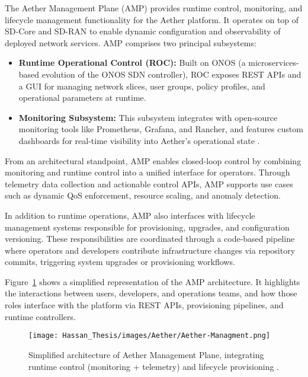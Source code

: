 The Aether Management Plane (AMP) provides runtime control, monitoring, and lifecycle management functionality for the Aether platform. It operates on top of SD-Core and SD-RAN to enable dynamic configuration and observability of deployed network services. AMP comprises two principal subsystems:

\begin{itemize}
    \item \textbf{Runtime Operational Control (ROC):} Built on \textmu ONOS (a microservices-based evolution of the ONOS SDN controller), ROC exposes REST APIs and a GUI for managing network slices, user groups, policy profiles, and operational parameters at runtime.
    
    \item \textbf{Monitoring Subsystem:} This subsystem integrates with open-source monitoring tools like Prometheus, Grafana, and Rancher, and features custom dashboards for real-time visibility into Aether's operational state \cite{roc_monitoring}.
\end{itemize}

From an architectural standpoint, AMP enables closed-loop control by combining monitoring and runtime control into a unified interface for operators. Through telemetry data collection and actionable control APIs, AMP supports use cases such as dynamic QoS enforcement, resource scaling, and anomaly detection.

In addition to runtime operations, AMP also interfaces with lifecycle management systems responsible for provisioning, upgrades, and configuration versioning. These responsibilities are coordinated through a code-based pipeline where operators and developers contribute infrastructure changes via repository commits, triggering system upgrades or provisioning workflows.

Figure~\ref{fig:amp-arch} shows a simplified representation of the AMP architecture. It highlights the interactions between users, developers, and operations teams, and how those roles interface with the platform via REST APIs, provisioning pipelines, and runtime controllers.

\begin{figure}[H]
    \centering
    \texttt{[image: Hassan\_Thesis/images/Aether/Aether-Managment.png]}
    \caption{Simplified architecture of Aether Management Plane, integrating runtime control (monitoring + telemetry) and lifecycle provisioning \cite{roc_monitoring}.}
    \label{fig:amp-arch}
\end{figure}


